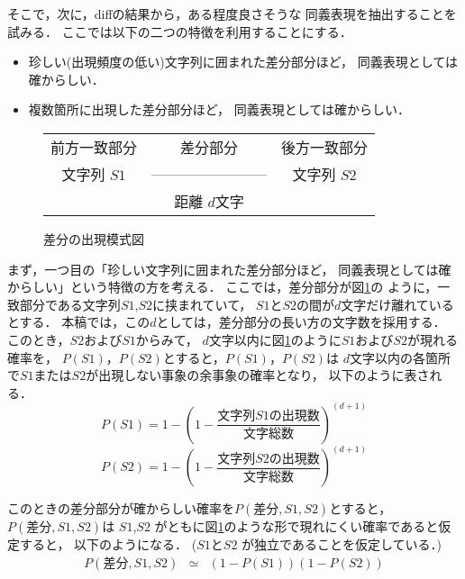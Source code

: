 そこで，次に，diffの結果から，ある程度良さそうな
同義表現を抽出することを試みる．
ここでは以下の二つの特徴を利用することにする．
\begin{itemize}
\item 
  珍しい(出現頻度の低い)文字列に囲まれた差分部分ほど，
  同義表現としては確からしい．
  
\item 
  複数箇所に出現した差分部分ほど，
  同義表現としては確からしい．
  
\end{itemize}

\begin{figure}[t]
  \begin{center}
\begin{tabular}{|ccc|}\hline
前方一致部分 & 差分部分 & 後方一致部分\\
文字列 $S1$ & ------------------------ & 文字列 $S2$\\
 & 距離 $d$文字 & \\\hline
\end{tabular}
    \leavevmode
    \caption{差分の出現模式図}
    \label{fig:sabun_moshiki_zu}
\end{center}
\end{figure}

まず，一つ目の「珍しい文字列に囲まれた差分部分ほど，
同義表現としては確からしい」という特徴の方を考える．
ここでは，差分部分が図\ref{fig:sabun_moshiki_zu}の
ように，一致部分である文字列$S1$,$S2$に挟まれていて，
$S1$と$S2$の間が$d$文字だけ離れているとする．
本稿では，この$d$としては，差分部分の長い方の文字数を採用する．
このとき，$S2$および$S1$からみて，
$d$文字以内に図\ref{fig:sabun_moshiki_zu}のように$S1$および$S2$が現れる確率を，
$P(S1)$，$P(S2)$とすると，$P(S1)$，$P(S2)$は
$d$文字以内の各箇所で$S1$または$S2$が出現しない事象の余事象の確率となり，
以下のように表される．
\begin{equation}
  \displaystyle P(S1) = 1 - ( 1 -  \frac{文字列S1の出現数}{文字総数} )^{(d+1)}
  \label{eq:ps1}
\end{equation}
\begin{equation}
  \displaystyle P(S2) = 1 - ( 1 -  \frac{文字列S2の出現数}{文字総数} )^{(d+1)}
\end{equation}

このときの差分部分が確からしい確率を$P(差分,S1,S2)$とすると，
$P(差分,S1,S2)$は
$S1$,$S2$ がともに図\ref{fig:sabun_moshiki_zu}のような形で現れにくい確率であると仮定すると，
以下のようになる．
($S1$と$S2$ が独立であることを仮定している．)
\begin{eqnarray}
P(差分,S1,S2) & \simeq &(1 - P(S1)) (1 - P(S2))
\end{eqnarray}

